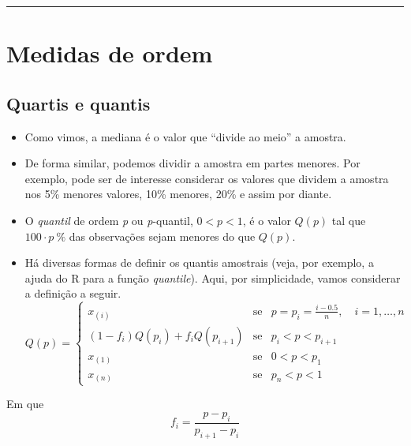 \documentclass[
]{book}
\begin{document}
\begin{center}\rule{0.5\linewidth}{0.5pt}\end{center}

\section{Medidas de ordem}\label{medidas-de-ordem}

\subsection{Quartis e quantis}\label{quartis-e-quantis}

\begin{itemize}
\item
  Como vimos, a mediana é o valor que ``divide ao meio'' a amostra.\\
\item
  De forma similar, podemos dividir a amostra em partes menores. Por exemplo, pode ser de interesse considerar os valores que dividem a amostra nos 5\% menores valores, 10\% menores, 20\% e assim por diante.\\
\item
  O \emph{quantil} de ordem \emph{p} ou \emph{p}-quantil, \(0 < p < 1\), é o valor \(Q(p)\) tal que \(100\cdot p~\%\) das
  observações sejam menores do que \(Q(p)\).
\item
  Há diversas formas de definir os quantis amostrais (veja, por exemplo, a ajuda do R para a função \emph{quantile}). Aqui, por simplicidade, vamos considerar a definição a seguir.
  \[
  Q(p) =
  \left\{
  \begin{array}{lll}
    x_{(i)} & \text{se} & p = p_i = \frac{i - 0.5}{n}, \quad i = 1, \ldots, n \\
    (1 - f_i) Q(p_i) + f_i Q(p_{i+1}) & \text{se} & p_i < p < p_{i+1} \\
    x_{(1)} & \text{se} & 0 < p < p_1 \\
    x_{(n)} & \text{se} & p_n < p < 1
  \end{array}
  \right.
  \]
\end{itemize}

Em que
\[
f_i = \dfrac{p-p_i}{p_{i+1}-p_i}
\]
\end{document}

